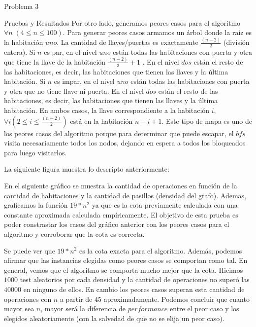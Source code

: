 \begin{section}{Problema 3}
\begin{subsection}{Pruebas y Resultados}
		Por otro lado, generamos peores casos para el algoritmo $\forall n\; (4 \leq n \leq 100)$. Para generar peores casos armamos un árbol donde la raíz es la habitación  $uno$. La cantidad de llaves/puertas es exactamente $\frac{(n-2)}{2}$ (división entera). Si $n$ es par, en el nivel $uno$  están todas las habitaciones con puerta y otra que tiene la llave de la habitación $\frac{(n-2)}{2} + 1$ . En el nivel $dos$ están el resto de las habitaciones, es decir, las habitaciones que tienen las llaves y la última habitación. Si $n$ es impar, en el nivel $uno$  están todas las habitaciones con puerta y otra que no tiene llave ni puerta. En el nivel $dos$ están el resto de las habitaciones, es decir, las habitaciones que tienen las llaves y la última habitación. En ambos casos, la llave correspondiente a la habitación $i$, $\forall i (2 \leq i \leq \frac{(n-2)}{2})$ está en la habitación $n-i+1$. Este tipo de mapa es uno de los peores casos del algoritmo porque para determinar que puede escapar, el $bfs$ visita necesariamente todos los nodos, dejando en espera a todos los bloqueados para luego visitarlos.

		La siguiente figura muestra lo descripto anteriormente:\VSP

		En el siguiente gráfico se muestra la cantidad de operaciones en función de la cantidad de habitaciones y la cantidad de pasillos (densidad del grafo). Ademas, graficamos la función $19*n^2$ ya que es la cota previamente calculada con una constante aproximada calculada empíricamente. El objetivo de esta prueba es poder constrastar los casos del gráfico anterior con los peores casos para el algoritmo y corroborar que la cota es correcta.
			

		Se puede ver que $19*n^2$ es la cota exacta para el algoritmo. Además, podemos afirmar que las instancias elegidas como peores casos se comportan como tal. En general, vemos que el algoritmo se comporta mucho mejor que la cota. Hicimos $1000$ test aleatorios por cada densidad y la cantidad de operaciones no superó las $40000$ en ninguno de ellos. En cambio los peores casos superan esta cantidad de operaciones con $n$ a partir de $45$ aproximadamente. Podemos concluir que cuanto mayor sea $n$, mayor será la diferencia de $performance$ entre el peor caso y los elegidos aleatoriamente (con la salvedad de que no se elija un peor caso).

		
	\end{subsection}

\end{section}


